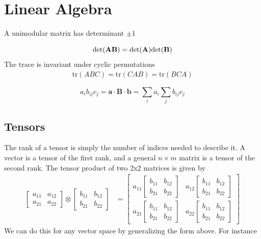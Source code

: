 \chapter{Linear Algebra}
A unimodular matrix has determinant $\pm 1$


$$\rm{det}(\bf{AB}) = \rm{det}(\bf{A})\rm{det}(\bf{B})$$
The trace is invariant under cyclic permutations
\begin{align}
	\textrm{tr}(ABC) = \textrm{tr}(CAB) = \textrm{tr}(BCA)
\end{align}

$$a_i b_{ij} c_j = \textbf{a}\cdot\textbf{B}\cdot\textbf{b} = \sum_{i} a_i \sum_{j} b_{ij} c_j$$

\section{Tensors}
The rank of a tensor is simply the number of indices needed to describe it. A vector is a tensor of the first rank, and a general $n \times m$ matrix is a tensor of the second rank. The tensor product of two 2x2 matrices is given by
\begin{align}
\begin{bmatrix}
a_{11} & a_{12} \\
a_{21} & a_{22}
\end{bmatrix}
\otimes
\begin{bmatrix}
b_{11} & b_{12} \\
b_{21} & b_{22}
\end{bmatrix} &=
\begin{bmatrix}
a_{11} \begin{bmatrix}
b_{11} & b_{12} \\
b_{21} & b_{22}
\end{bmatrix}& a_{12} \begin{bmatrix}
b_{11} & b_{12} \\
b_{21} & b_{22}
\end{bmatrix}\\
a_{21} \begin{bmatrix}
b_{11} & b_{12} \\
b_{21} & b_{22}
\end{bmatrix}& a_{22}\begin{bmatrix}
b_{11} & b_{12} \\
b_{21} & b_{22}
\end{bmatrix}
\end{bmatrix}
\end{align}
We can do this for any vector space by generalizing the form above. For instance

